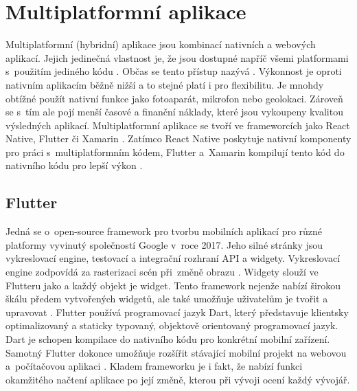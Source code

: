 \section{Multiplatformní aplikace}
Multiplatformní (hybridní) aplikace jsou kombinací nativních a webových aplikací. Jejich jedinečná vlastnost je, že jsou dostupné napříč všemi platformami s~použitím jediného kódu \cite{mobiles}. Občas se tento přístup nazývá  \cite{mobilesibm}. Výkonnost je oproti nativním aplikacím běžně nižší a to stejné platí i pro flexibilitu. Je mnohdy obtížné použít nativní funkce jako fotoaparát, mikrofon nebo geolokaci. Zároveň se s~tím ale pojí menší časové a finanční náklady, které jsou vykoupeny kvalitou výsledných aplikací. Multiplatformní aplikace se tvoří ve frameworcích jako React Native, Flutter či Xamarin \cite{mobilesuptech}.  Zatímco React Native poskytuje nativní komponenty pro práci s~multiplatformním kódem, Flutter a~Xamarin kompilují tento kód do nativního kódu pro lepší výkon \cite{mobilesamazon}. 

\subsection{Flutter}
Jedná se o~open-source framework pro tvorbu mobilních aplikací pro různé platformy vyvinutý společností Google v~roce 2017.  Jeho silné stránky jsou vykreslovací engine, testovací a integrační rozhraní API a widgety. Vykreslovací engine zodpovídá za rasterizaci scén při~změně obrazu \cite{flutter}. Widgety slouží ve Flutteru jako  a každý objekt je widget. Tento framework nejenže nabízí širokou škálu předem vytvořených widgetů, ale také umožňuje uživatelům je tvořit a upravovat \cite{flutter2}. Flutter používá programovací jazyk Dart, který představuje klientsky optimalizovaný a staticky typovaný, objektově orientovaný programovací jazyk. Dart je schopen kompilace do nativního kódu pro konkrétní mobilní zařízení. Samotný Flutter dokonce umožňuje rozšířit stávající mobilní projekt na webovou a~počítačovou aplikaci \cite{flutter3}. Kladem frameworku je i fakt, že nabízí funkci okamžitého načtení aplikace po její změně, kterou při vývoji ocení každý vývojář.

